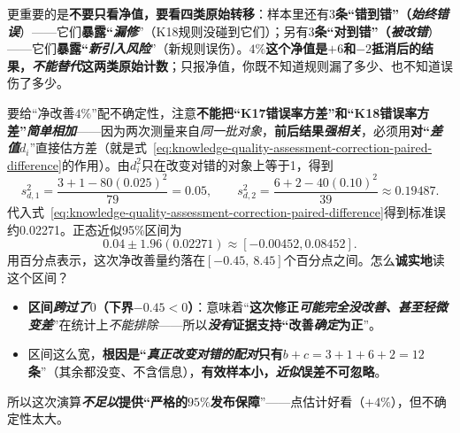 更重要的是\textbf{不要只看净值，要看四类原始转移}：样本里还有\textbf{$3$条“错到错”（\emph{始终错误}}）——它们\textbf{暴露“\emph{漏修}}”（K18规则没碰到它们）；另有\textbf{$3$条“对到错”（\emph{被改错}}）——它们\textbf{暴露“\emph{新引入风险}}”（新规则误伤）。\textbf{$4\%$这个净值是$+6$和$-2$抵消后的结果，\emph{不能替代}这两类原始计数}；只报净值，你既不知道规则漏了多少、也不知道误伤了多少。

要给“净改善$4\%$”配不确定性，注意\textbf{不能把“K17错误率方差”和“K18错误率方差”\emph{简单相加}}——因为两次测量来自\emph{同一批对象}，\textbf{前后结果\emph{强相关}}，必须用\textbf{对“\emph{差值}$d_i$}”直接估方差（就是式~\eqref{eq:knowledge-quality-assessment-correction-paired-difference}的作用）。由$d_i^2$只在改变对错的对象上等于1，得到
\[
  s_{d,1}^2=\frac{3+1-80(0.025)^2}{79}=0.05,\qquad
  s_{d,2}^2=\frac{6+2-40(0.10)^2}{39}\approx0.19487.
\]
代入式~\eqref{eq:knowledge-quality-assessment-correction-paired-difference}得到标准误约0.02271。正态近似95\%区间为
\[
  0.04\pm1.96(0.02271)
  \approx[-0.00452,0.08452].
\]
用百分点表示，这次净改善量约落在$\boldsymbol{[-0.45,\ 8.45]}$个百分点之间。怎么\textbf{诚实地}读这个区间？
\begin{itemize}\item \textbf{区间\emph{跨过了$0$}（下界$-0.45<0$）}：意味着“\textbf{这次修正\emph{可能}\emph{完全没改善、甚至轻微变差}}”在统计上\emph{不能排除}——所以\textbf{\emph{没有}证据支持“改善\emph{确定}为正}”。\item 区间这么宽，\textbf{根因是“\emph{真正改变对错的配对}只有$b+c=3+1+6+2=12$条}”（其余都没变、不含信息），\textbf{有效样本小，\emph{近似}误差不可忽略}。\end{itemize}
所以这次演算\textbf{\emph{不足以}提供“严格的$95\%$发布保障}”——点估计好看（$+4\%$），但不确定性太大。

